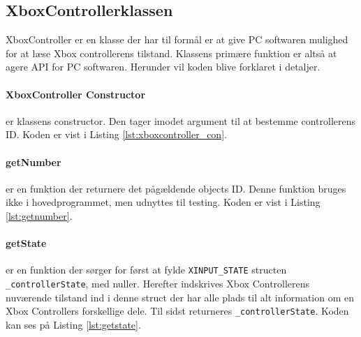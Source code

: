 \subsection{XboxControllerklassen} \label{sec:xboxcontroller_impl}

XboxController er en klasse der har til formål er at give PC softwaren mulighed for at læse Xbox controllerens tilstand. Klassens primære funktion er altså at agere API for PC softwaren.
Herunder vil koden blive forklaret i detaljer.


\paragraph{XboxController Constructor} er klassens constructor. Den tager imodet argument til at bestemme controllerens ID. Koden er vist i Listing \ref{lst:xboxcontroller_con}.




\paragraph{getNumber} er en funktion der returnere det pågældende objects ID. Denne funktion bruges ikke i hovedprogrammet, men udnyttes til testing. Koden er vist i Listing \ref{lst:getnumber}.




\paragraph{getState} er en funktion der sørger for først at fylde \texttt{XINPUT\_STATE} structen \texttt{\_controllerState}, med nuller. Herefter indskrives Xbox Controllerens nuværende tilstand ind i denne struct der har alle plads til alt information om en Xbox Controllers forskellige dele. Til sidst returneres \texttt{\_controllerState}. Koden kan ses på Listing \ref{lst:getstate}.



